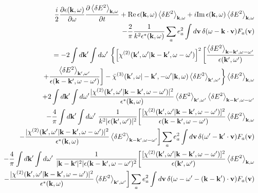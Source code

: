 \documentclass[10pt,aspectratio=1610,lualatex]{beamer}
\begin{document}
\begin{frame}\vspace{-0.6cm}
  \begin{eqnarray}
    &&\frac{i}{2}\frac{\partial \epsilon({\bf k},\omega)}{\partial \omega}
       \frac{\partial \left<\delta E^2\right>_{{\bf k},\omega}}{\partial t}
       +\mbox{Re}\,\epsilon({\bf k},\omega)\left<\delta E^2 \right>_{{\bf k},\omega}
       +i\mbox{Im}\,\epsilon({\bf k},\omega)\left<\delta E^2 \right>_{{\bf k},\omega}
       \nonumber\\
    &&\qquad \qquad \qquad -\frac{2}{\pi}\frac{1}{k^2\epsilon^*({\bf k},\omega)}
       \sum_a e_a^2\int d{\bf v}\,\delta(\omega-{\bf k\cdot v})F_a({\bf v})
       \nonumber\\
    &&=-2\int d{\bf k'} \int d\omega '\
       \biggl\{ \left[\chi^{(2)}({\bf k'},\omega '|{\bf k-k'},
       \omega-\omega ')\right]^2
       \biggl[\frac{\left<\delta E^2\right>_{{\bf k - k'},\omega-\omega '}}
       {\epsilon({\bf k'},\omega ')}
       \nonumber\\
    &&+\frac{\left<\delta E^2\right>_{{\bf k'},\omega '}}
       {\epsilon({\bf k - k'},\omega-\omega ')}\biggr]
       -\bar \chi^{(3)}({\bf k'},\omega|-{\bf k'},-\omega '|{\bf k},\omega)
       \left<\delta E^2\right>_{{\bf k'},\omega'}\biggr\}
       \left<\delta E^2\right>_{{\bf k},\omega}\nonumber\\
    &&+2\int d{\bf k'} \int d\omega '
       \frac{|\chi^{(2)}({\bf k'},\omega '|{\bf k-k'},\omega-\omega ')|^2}
       {\epsilon^*({\bf k},\omega)}
       \left<\delta E^2\right>_{{\bf k'},\omega '}
       \left<\delta E^2\right>_{{\bf k-k'},\omega-\omega '}
       \label{nlebe}\\
    &&-\frac{4}{\pi}\int d{\bf k '} \int d\omega '\
       \frac{1}{k^2|\epsilon({\bf k'},\omega ')|^2}
       \biggl[ \frac{[\chi^{(2)}({\bf k'},\omega '|{\bf k-k'},\omega-\omega ')]^2}
       {\epsilon({\bf k-k'},\omega-\omega ')}
       \left<\delta E^2 \right>_{{\bf k},\omega}
       \nonumber\\
    &&-\frac{|\chi^{(2)}({\bf k'},\omega '|{\bf k-k'},\omega-\omega ')|^2}
       {\epsilon^*({\bf k},\omega)}
       \left<\delta E^2 \right>_{{\bf k-k'},\omega-\omega '}\biggr]
       \sum_ae_a^2\int d{\bf v}\, \delta(\omega '-{\bf k' \cdot v})F_a({\bf v})
       \nonumber\\
    &&-\frac{4}{\pi}\int d{\bf k '} \int d\omega '\
       \frac{1}{|{\bf k - k'}|^2|\epsilon({\bf k-k'},\omega-\omega ')^2}
       \biggl[ \frac{[\chi^{(2)}({\bf k'},\omega '|{\bf k-k'},\omega-\omega ')]^2}
       {\epsilon({\bf k'},\omega ')}\left<\delta E^2 \right>_{{\bf k},\omega}
       \nonumber\\
    &&-\frac{|\chi^{(2)}({\bf k'},\omega '|{\bf k-k'},\omega-\omega ')|^2}
       {\epsilon^*({\bf k},\omega)}
       \left<\delta E^2 \right>_{{\bf k'},\omega '}\biggr]\sum_ae_a^2\int d{\bf v}\,
       \delta(\omega-\omega '-{\bf (k-k')\cdot v})F_a({\bf v})
       \nonumber
  \end{eqnarray}
\end{frame}
\end{document}
